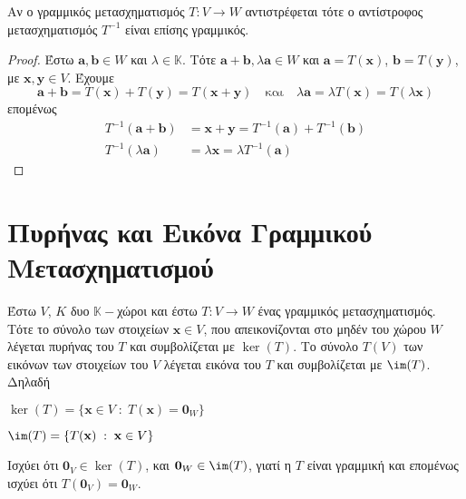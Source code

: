 \begin{prop}
  Αν ο γραμμικός μετασχηματισμός $ T \colon V \to W $ αντιστρέφεται τότε ο αντίστροφος 
  μετασχηματισμός $ T^{-1} $ είναι επίσης γραμμικός.
\end{prop}
\begin{proof}
  Έστω $ \mathbf{a}, \mathbf{b} \in W $ και $ \lambda \in \mathbb{K} $. Τότε 
  $ \mathbf{a} + \mathbf{b}, \lambda \mathbf{a} \in W $ και 
  $ \mathbf{a}= T(\mathbf{x}) $, $ \mathbf{b} = T(\mathbf{y}) $, με 
  $ \mathbf{x}, \mathbf{y} \in V $. Έχουμε
  \begin{equation*}
    \mathbf{a}+ \mathbf{b} = T(\mathbf{x}) + T(\mathbf{y}) = T(\mathbf{x}+ \mathbf{y})
    \quad \text{και} \quad
    \lambda \mathbf{a} = \lambda T(\mathbf{x}) = T(\lambda \mathbf{x})
  \end{equation*}
  επομένως
  \begin{align*}
    T^{-1} (\mathbf{a}+ \mathbf{b}) &= \mathbf{x} + \mathbf{y} = T^{-1} (\mathbf{a}) 
    + T^{-1} (\mathbf{b}) \\
    T^{-1} (\lambda \mathbf{a}) &= \lambda \mathbf{x} = \lambda T^{-1} (\mathbf{a})
   \end{align*} 
\end{proof}


\section{Πυρήνας και Εικόνα Γραμμικού Μετασχηματισμού}

\begin{dfn}
  Έστω $V$, $K$ δυο $ \mathbb{K}- $χώροι και έστω $ T \colon V \to W $ ένας 
  γραμμικός μετασχηματισμός. Τότε 
  το σύνολο των στοιχείων $ \mathbf{x} \in V $, που απεικονίζονται στο μηδέν του χώρου 
  $W$ λέγεται \textcolor{Col1}{πυρήνας} του $T$ και συμβολίζεται με $ \ker(T) $. 
  Το σύνολο $T(V)$ των εικόνων των στοιχείων του $V$ λέγεται \textcolor{Col1}{εικόνα} 
  του $T$ και συμβολίζεται με $ \im(T) $. Δηλαδή
  \begin{myitemize}
    \item $ \ker(T) = \{ \mathbf{x} \in V \; : \; T(\mathbf{x}) = \mathbf{0}_{W} \} $ 
    \item $ \im(T) = \{ T(\mathbf{x}) \; : \; \mathbf{x} \in V \} $ 
  \end{myitemize}
\end{dfn}

\begin{rem}
  Ισχύει ότι $ \mathbf{0}_{V} \in \ker(T) $, και $ \mathbf{0}_{W} \in \im(T)
  $, γιατί η $T$ είναι γραμμική και επομένως ισχύει ότι 
  $ T(\mathbf{0}_{V}) = \mathbf{0}_{W} $.
\end{rem}

